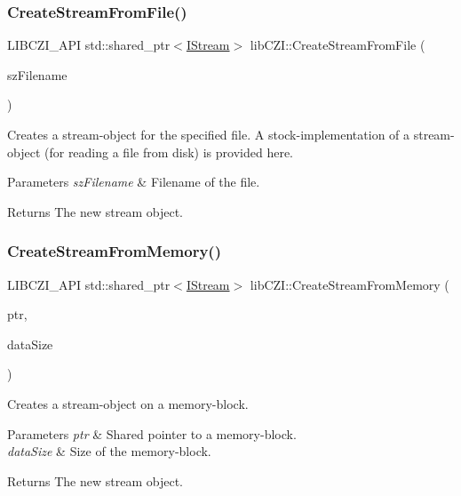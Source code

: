 \subsubsection{\texorpdfstring{Create\+Stream\+From\+File()}{CreateStreamFromFile()}}
{\footnotesize\ttfamily L\+I\+B\+C\+Z\+I\+\_\+\+A\+PI std\+::shared\+\_\+ptr$<$\hyperlink{classlib_c_z_i_1_1_i_stream}{I\+Stream}$>$ lib\+C\+Z\+I\+::\+Create\+Stream\+From\+File (\begin{DoxyParamCaption}\item[{const wchar\+\_\+t $\ast$}]{sz\+Filename }\end{DoxyParamCaption})}

Creates a stream-\/object for the specified file. A stock-\/implementation of a stream-\/object (for reading a file from disk) is provided here. 
\begin{DoxyParams}{Parameters}
{\em sz\+Filename} & Filename of the file. \\
\hline
\end{DoxyParams}
\begin{DoxyReturn}{Returns}
The new stream object. 
\end{DoxyReturn}
\mbox{\label{namespacelib_c_z_i_afc0c5e268aa30fc812911a1a6eef44fb}} 
\subsubsection{\texorpdfstring{Create\+Stream\+From\+Memory()}{CreateStreamFromMemory()}\hspace{0.1cm}{\footnotesize\ttfamily [1/2]}}
{\footnotesize\ttfamily L\+I\+B\+C\+Z\+I\+\_\+\+A\+PI std\+::shared\+\_\+ptr$<$\hyperlink{classlib_c_z_i_1_1_i_stream}{I\+Stream}$>$ lib\+C\+Z\+I\+::\+Create\+Stream\+From\+Memory (\begin{DoxyParamCaption}\item[{std\+::shared\+\_\+ptr$<$ const void $>$}]{ptr,  }\item[{size\+\_\+t}]{data\+Size }\end{DoxyParamCaption})}

Creates a stream-\/object on a memory-\/block. 
\begin{DoxyParams}{Parameters}
{\em ptr} & Shared pointer to a memory-\/block. \\
\hline
{\em data\+Size} & Size of the memory-\/block. \\
\hline
\end{DoxyParams}
\begin{DoxyReturn}{Returns}
The new stream object. 
\end{DoxyReturn}
\mbox{\label{namespacelib_c_z_i_a27a30c227f027817b36e29ac259b270c}} 
